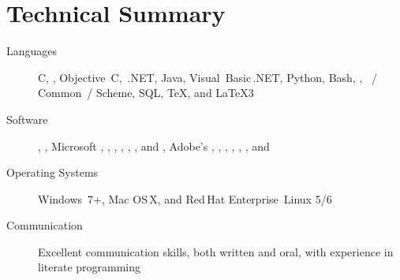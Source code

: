 \documentclass{simplecv}
\begin{document}
\maketitle
\vfill
\section{Technical Summary}
\begin{minipage}{\textwidth}
\begin{description}
\item[Languages]
  C,
  \CPP,
  Objective~C,
  \CSharp\,.NET,
  Java,
  Visual~Basic\,.NET,
  Python,
  Bash,
  ,
  ~\Lisp\slash
            Common~\Lisp\slash
            Scheme,
  SQL,
  \TeX,
  and
  \LaTeX 3

\item[Software]
  ,
  ,
  Microsoft ,
            ,
            ,
            ,
            ,
            ,
            and
            ,
  Adobe's
    ,
    ,
    ,
  ,
  ,
  ,
  and

\item[Operating Systems]
  Windows~7+,
  Mac OS\,X,
  and
  Red\,Hat Enterprise~Linux 5\slash 6

\item[Communication]
  Excellent communication skills, both written and oral,
    with experience in literate programming
\end{description}
\end{minipage}

\vfill
\end{document}
